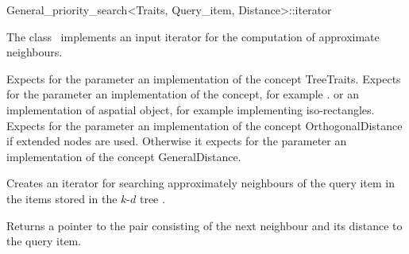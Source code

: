 

\begin{ccRefClass}{General_priority_search<Traits, Query_item, Distance>::iterator}  %


\ccDefinition

The class \ccRefName\ implements an input iterator
for the computation of approximate neighbours.


\ccParameters

Expects for the parameter  an implementation of the concept TreeTraits.
Expects for the parameter   an implementation of the
 concept, for example .
or an implementation of aspatial object, for
example  implementing iso-rectangles.
Expects for the parameter  an implementation of the concept OrthogonalDistance if extended
nodes are used. Otherwise it expects for the parameter  an implementation of the
concept GeneralDistance.

\ccCreation
{}  %

{Creates an iterator for searching approximately neighbours of the query item 
in the items stored in the $k$-$d$ tree .}


{Returns a pointer to the pair consisting of the next neighbour and its distance
to the query item.}


\end{ccRefClass}
